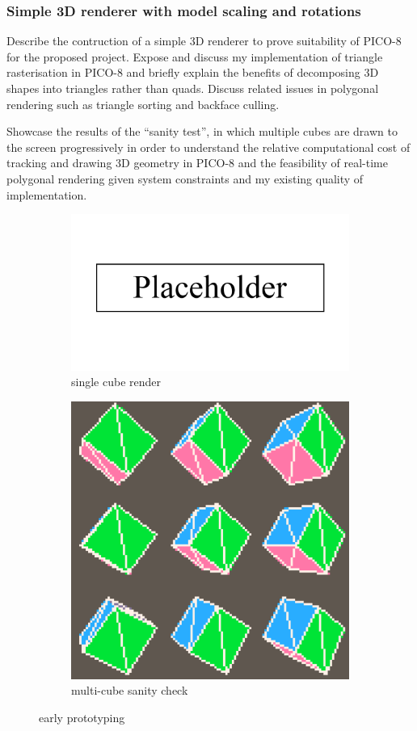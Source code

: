 \documentclass{article}
\begin{document}
\subsubsection*{Simple 3D renderer with model scaling and rotations}
Describe the contruction of a simple 3D renderer to prove suitability of PICO-8 for
the proposed project. Expose and discuss my implementation of triangle rasterisation
in PICO-8 and briefly explain the benefits of decomposing 3D shapes into triangles
rather than quads. Discuss related issues in polygonal rendering such as triangle
sorting and backface culling.

Showcase the results of the ``sanity test'', in which multiple
cubes are drawn to the screen progressively in order to understand the relative
computational cost of tracking and drawing 3D geometry in PICO-8 and the feasibility
of real-time polygonal rendering given system constraints and my existing quality
of implementation.

\begin{figure}[h]
\begin{subfigure}{.5\textwidth}
  \centering
  \includegraphics[width=.8\linewidth]{placeholder}
  \caption{single cube render}
  \label{fig:3dfig1}
\end{subfigure}
\begin{subfigure}{.5\textwidth}
  \centering
  \includegraphics[width=.8\linewidth]{test3d}
  \caption{multi-cube sanity check}
  \label{fig:3dfig2}
\end{subfigure}
\caption{early prototyping}
\label{fig:3dprototype}
\end{figure}
\end{document}
